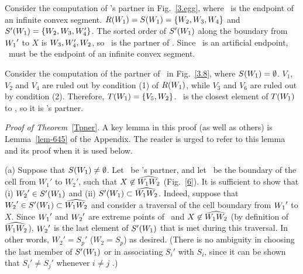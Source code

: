 \begin{example}
{\rm 
Consider the computation of \wo's partner in Fig.~\ref{3.egg}, 
where \wo\ is the endpoint of an infinite convex segment.
\mbox{$R(\mbox{$W_{1}$}) = S(\mbox{$W_{1}$}) = \{\mbox{$W_{2}$},W_{3},W_{4}\}$} and
\mbox{$S'(\mbox{$W_{1}$}) = \{\mbox{$W_{2}$},W_{3},W_{4}'\}$}.
The sorted order of $S'(\mbox{$W_{1}$})$ along the boundary from $\mbox{$W_{1}$} '$ to $X$
is $W_{3},W_{4}',\mbox{$W_{2}$}$, so \wt\ is the partner of \wo.  
Since \wt\ is an artificial endpoint, \wo\ must be the endpoint of an 
infinite convex segment.


Consider the computation of the partner of \wo\ in Fig.~\ref{3.8},
where $S(\mbox{$W_{1}$}) = \emptyset$.
$V_{1}$, $V_{2}$ and $V_{4}$ are ruled out by condition (1) of $R(\mbox{$W_{1}$})$,
while $V_{3}$ and $V_{6}$ are ruled out by condition (2).
Therefore, $T(\mbox{$W_{1}$}) = \{V_{5},W_{2}\}$.
\wt\ is the closest element of $T(\mbox{$W_{1}$})$ to \wo, so it is \wo's partner.
}
\end{example}


\par{\it Proof of Theorem}~\ref{Tpner}. \ignorespaces
A key lemma in this proof (as well as others) is Lemma~\ref{lem-645} of the Appendix.
The reader is urged to refer to this lemma and its proof when it is used below.
%
%

(a) Suppose that $S(\mbox{$W_{1}$}) \neq \emptyset$.
Let \wt\ be \wo's partner, and let \wwh\ be the boundary of the cell 
from $W_{1}'$ to $W_{2}'$, such that $X \not\in \mbox{$\widehat{W_{1}W_{2}}$}$ (Fig.~\ref{6}).
It is sufficient to show that (i) $\mbox{$W_{2}$} ' \in S'(\mbox{$W_{1}$})$ and (ii) $S'(\mbox{$W_{1}$}) \subset \mbox{$\widehat{W_{1}W_{2}}$}$.
Indeed, suppose that $\mbox{$W_{2}$} ' \in S'(\mbox{$W_{1}$}) \subset \mbox{$\widehat{W_{1}W_{2}}$}$
and consider a traversal of the cell boundary from $\mbox{$W_{1}$} '$ to $X$. 
Since $\mbox{$W_{1}$} '$ and $\mbox{$W_{2}$} '$ are extreme points of \wwh\ and
$X \not \in \mbox{$\widehat{W_{1}W_{2}}$}$ (by definition of $\mbox{$\widehat{W_{1}W_{2}}$}$), 
$\mbox{$W_{2}$} '$ is the last element of $S'(\mbox{$W_{1}$})$ that is met during this traversal.
In other words, $W_{2}' = S_{p}'$ ($W_{2} = S_{p}$) as desired.
(There is no ambiguity in choosing the last member of $S'(\mbox{$W_{1}$})$ or in associating
$S_{i}'$ with $S_{i}$, since it can be shown that $S_{i}' \neq S_{j}'$ 
whenever $i \neq j$ \cite[p. 75]{jj}.)  %

